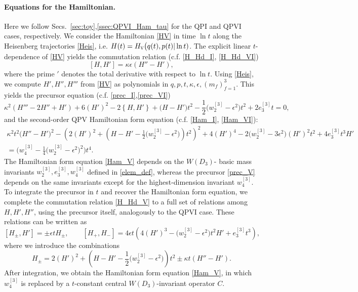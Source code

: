 \documentclass[12pt,a4paper]{article}
\numberwithin{equation}{section}
\newcommand{\V}{\scalebox{.6}{V}}
\begin{document}
\paragraph{Equations for the Hamiltonian.}
Here we follow Secs.~\ref{sec:toy},\ref{ssec:QPVI_Ham_tau} for the QPI and QPVI cases, respectively. We consider the Hamiltonian \eqref{HV} in time $\ln t$ along the Heisenberg trajectories \eqref{Heis}, i.e.  
$H(t)=H_{\V}\big(q(t),p(t)|\ln t)$. The explicit linear $t$-dependence of \eqref{HV} yields the commutation relation (c.f. \eqref{H_Hd_I}, \eqref{H_Hd_VI})
\begin{equation}\label{H_Hd_V}
[H,H']=\kappa\epsilon (H''-H'),   
\end{equation}
where the prime $'$ denotes the total derivative with respect to $\ln t$. Using \eqref{Heis}, we compute $H',H'',H'''$ from \eqref{HV} as polynomials in $q,p,t,\kappa,\epsilon,(m_f)_{f=1}^3$. This yields the precursor equation (c.f. \eqref{prec_I},\eqref{prec_VI})
\begin{equation}\label{prec_V}
\kappa^2(H'''-2H''+H')+6(H')^2-2\left\{H,H'\right\}+\big(H-H'\big)t^2-\frac12\big(w_2^{[3]}{-}\epsilon^2\big)t^2+2e_3^{[3]}t=0,
\end{equation} 
and the second-order QPV Hamiltonian form equation (c.f. \eqref{Ham_I}, \eqref{Ham_VI}):
\begin{multline}\label{Ham_V}
\kappa^2t^2\Big(H''-H'\Big)^2-\left(2(H')^2+\left(H-H'{-}\frac12\big(w_2^{[3]}{-}\epsilon^2\big)\right)t^2\right)^2+4(H')^4-2\big(w_2^{[3]}{-}3\epsilon^2\big)(H')^2t^2+4e_3^{[3]}t^3H'\\=\Big(w_4^{[3]}-\frac14\big(w_2^{[3]}{-}\epsilon^2\big)^2\Big)t^4.
\end{multline}
The Hamiltonian form equation \eqref{Ham_V} depends on the $W(D_3)$- basic mass invariants $w_2^{[3]},e_3^{[3]},w_4^{[3]}$ defined in \eqref{elem_def}, whereas the precursor \eqref{prec_V} depends on the same invariants except for the highest-dimension invariant $w_4^{[3]}$. 
To integrate the precursor in $t$ and recover the Hamiltonian form equation, we complete the commutation relation \eqref{H_Hd_V} to a full set of relations among $H,H',H''$, using the precursor itself, analogously to the QPVI case. These relations can be written as
\begin{equation}\label{triple_V}
[H_\pm,H']=\pm\epsilon t H_{\pm}, \qquad [H_+,H_-]=4\epsilon t\left(4(H')^3-\big(w_2^{[3]}{-}\epsilon^2\big)t^2H'+e_3^{[3]}t^3\right),
\end{equation}
where we introduce the combinations
\begin{equation}\label{comb_V}
H_{\pm}=2(H')^2+\left(H-H'{-}\frac12\big(w_2^{[3]}{-}\epsilon^2\big)\right)t^2\pm\kappa t(H''{-}H').
\end{equation}
After integration, we obtain the Hamiltonian form equation \eqref{Ham_V}, in which $w_4^{[3]}$ is replaced by a $t$-constant central $W(D_3)$-invariant operator $C$.
\end{document}
